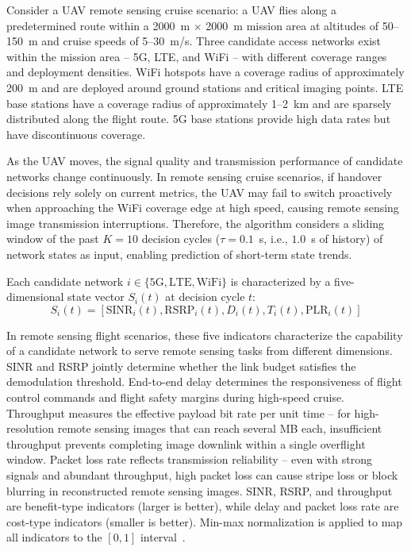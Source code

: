 \documentclass[journal,article,submit,moreauthors]{Definitions/mdpi}
\begin{document}
Consider a UAV remote sensing cruise scenario: a UAV flies along a predetermined route within a 2000~m $\times$ 2000~m mission area at altitudes of 50--150~m and cruise speeds of 5--30~m/s. Three candidate access networks exist within the mission area -- 5G, LTE, and WiFi -- with different coverage ranges and deployment densities. WiFi hotspots have a coverage radius of approximately 200~m and are deployed around ground stations and critical imaging points. LTE base stations have a coverage radius of approximately 1--2~km and are sparsely distributed along the flight route. 5G base stations provide high data rates but have discontinuous coverage.

As the UAV moves, the signal quality and transmission performance of candidate networks change continuously. In remote sensing cruise scenarios, if handover decisions rely solely on current metrics, the UAV may fail to switch proactively when approaching the WiFi coverage edge at high speed, causing remote sensing image transmission interruptions. Therefore, the algorithm considers a sliding window of the past $K = 10$ decision cycles ($\tau = 0.1$~s, i.e., $1.0$~s of history) of network states as input, enabling prediction of short-term state trends.

Each candidate network $i \in \{\text{5G}, \text{LTE}, \text{WiFi}\}$ is characterized by a five-dimensional state vector $S_i(t)$ at decision cycle $t$:
\begin{equation}
S_i(t) = [\text{SINR}_i(t), \text{RSRP}_i(t), D_i(t), T_i(t), \text{PLR}_i(t)]
\label{eq:state}
\end{equation}

In remote sensing flight scenarios, these five indicators characterize the capability of a candidate network to serve remote sensing tasks from different dimensions. SINR and RSRP jointly determine whether the link budget satisfies the demodulation threshold. End-to-end delay determines the responsiveness of flight control commands and flight safety margins during high-speed cruise. Throughput measures the effective payload bit rate per unit time -- for high-resolution remote sensing images that can reach several MB each, insufficient throughput prevents completing image downlink within a single overflight window. Packet loss rate reflects transmission reliability -- even with strong signals and abundant throughput, high packet loss can cause stripe loss or block blurring in reconstructed remote sensing images. SINR, RSRP, and throughput are benefit-type indicators (larger is better), while delay and packet loss rate are cost-type indicators (smaller is better). Min-max normalization is applied to map all indicators to the $[0,1]$ interval~\cite{ref22}.
\end{document}
